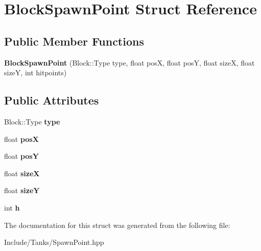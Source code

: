 \hypertarget{struct_block_spawn_point}{}\section{Block\+Spawn\+Point Struct Reference}
\label{struct_block_spawn_point}
\subsection*{Public Member Functions}
\begin{DoxyCompactItemize}
\item 
\hypertarget{struct_block_spawn_point_a1f10b377017daf9e0ecbbab67ba9f4db}{}{\bfseries Block\+Spawn\+Point} (Block\+::\+Type type, float pos\+X, float pos\+Y, float size\+X, float size\+Y, int hitpoints)\label{struct_block_spawn_point_a1f10b377017daf9e0ecbbab67ba9f4db}

\end{DoxyCompactItemize}
\subsection*{Public Attributes}
\begin{DoxyCompactItemize}
\item 
\hypertarget{struct_block_spawn_point_a86b9ddbd98a8d16361407ff696a23e54}{}Block\+::\+Type {\bfseries type}\label{struct_block_spawn_point_a86b9ddbd98a8d16361407ff696a23e54}

\item 
\hypertarget{struct_block_spawn_point_acad0a5ad2123588f6f0fe0ba70e8151f}{}float {\bfseries pos\+X}\label{struct_block_spawn_point_acad0a5ad2123588f6f0fe0ba70e8151f}

\item 
\hypertarget{struct_block_spawn_point_a1828f6c8b339f389e51faee31748fb55}{}float {\bfseries pos\+Y}\label{struct_block_spawn_point_a1828f6c8b339f389e51faee31748fb55}

\item 
\hypertarget{struct_block_spawn_point_ab4f5e8ffb38404f07794538292a9d86c}{}float {\bfseries size\+X}\label{struct_block_spawn_point_ab4f5e8ffb38404f07794538292a9d86c}

\item 
\hypertarget{struct_block_spawn_point_aa8732ffb118fe2c3c855024bf7fda9b2}{}float {\bfseries size\+Y}\label{struct_block_spawn_point_aa8732ffb118fe2c3c855024bf7fda9b2}

\item 
\hypertarget{struct_block_spawn_point_a33b21c50009db97f4768da034292775e}{}int {\bfseries h}\label{struct_block_spawn_point_a33b21c50009db97f4768da034292775e}

\end{DoxyCompactItemize}


The documentation for this struct was generated from the following file\+:\begin{DoxyCompactItemize}
\item 
Include/\+Tanks/Spawn\+Point.\+hpp\end{DoxyCompactItemize}
